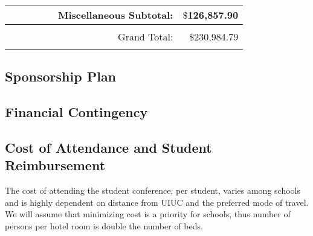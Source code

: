 \begin{tabular}{|clcrccccr|}
     &                           &                           &                           &                           &\multicolumn{3}{r}{Miscellaneous Subtotal:}                                       & $\$$126,857.90           \\ \hline\hline
     &                           &                           &                           &                           &                          &                           &                           &                          \\
     &                           &                           &                           &                           &\multicolumn{3}{r}{Grand Total:}                                                  & $\$$230,984.79           \\
     &                           &                           &                           &                           &                          &                           &                           &                          \\ \hline
  \end{tabular}
\subsection{Sponsorship Plan}



\subsection{Financial Contingency}

\subsection{Cost of Attendance and Student Reimbursement}
The cost of attending the student conference, per student, varies among schools and is highly dependent on distance from UIUC and the preferred mode of travel. We will assume that minimizing cost is a priority for schools, thus number of persons per hotel room is double the number of beds. 

